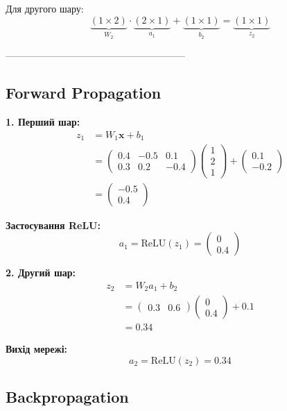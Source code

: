 \documentclass{article}
\begin{document}
Для другого шару:
\[\underbrace{(1 \times 2)}_{W_2} \cdot \underbrace{(2 \times 1)}_{a_1} + \underbrace{(1 \times 1)}_{b_2} = \underbrace{(1 \times 1)}_{z_2}\]

--------------------------------------------------------
\subsection{Forward Propagation}

\textbf{1. Перший шар:}
\begin{align*}
z_1 &= W_1\mathbf{x} + b_1 \\
&= \begin{pmatrix} 
0.4 & -0.5 & 0.1 \\
0.3 & 0.2 & -0.4
\end{pmatrix} \begin{pmatrix} 1 \\ 2 \\ 1 \end{pmatrix} + 
\begin{pmatrix} 0.1 \\ -0.2 \end{pmatrix} \\
&= \begin{pmatrix} -0.5 \\ 0.4 \end{pmatrix}
\end{align*}

\textbf{Застосування ReLU:}
\[a_1 = \text{ReLU}(z_1) = \begin{pmatrix} 0 \\ 0.4 \end{pmatrix}\]

\textbf{2. Другий шар:}
\begin{align*}
z_2 &= W_2a_1 + b_2 \\
&= \begin{pmatrix} 0.3 & 0.6 \end{pmatrix} \begin{pmatrix} 0 \\ 0.4 \end{pmatrix} + 0.1 \\
&= 0.34
\end{align*}

\textbf{Вихід мережі:}
\[a_2 = \text{ReLU}(z_2) = 0.34\]

\subsection{Backpropagation}
\end{document}

